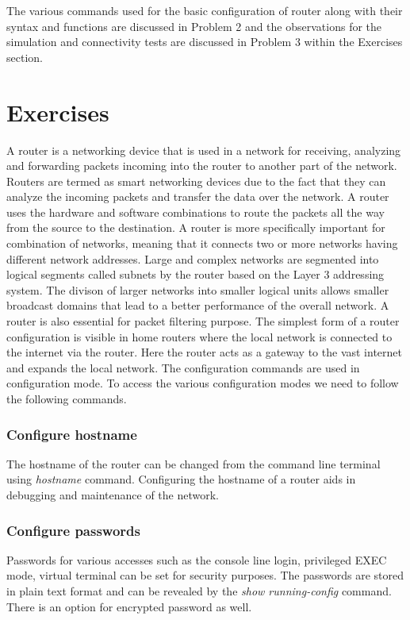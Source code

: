 \documentclass{lab_sheet}
\newcommand{\syntax}[2]{
    
}
\begin{document}
    The various commands used for the basic configuration of router along with their syntax and functions are discussed in Problem 2 and the observations for the simulation and connectivity tests are discussed in Problem 3 within the Exercises section.
    \section{Exercises}
    A router is a networking device that is used in a network for receiving, analyzing and forwarding packets incoming into the router to another part of the network. Routers are termed as smart networking devices due to the fact that they can analyze the incoming packets and transfer the data over the network. A router uses the hardware and software combinations to route the packets all the way from the source to the destination. A router is more specifically important for combination of networks, meaning that it connects two or more networks having different network addresses. Large and complex networks are segmented into logical segments called subnets by the router based on the Layer 3 addressing system. The divison of larger networks into smaller logical units allows smaller broadcast domains that lead to a better performance of the overall network. A router is also essential for packet filtering purpose. The simplest form of a router configuration is visible in home routers where the local network is connected to the internet via the router. Here the router acts as a gateway to the vast internet and expands the local network.
    The configuration commands are used in configuration mode. To access the various configuration modes we need to follow the following commands.
    \syntax{modes}{various router modes}
    \subsubsection*{Configure hostname}
    The hostname of the router can be changed from the command line terminal using \textit{hostname} command. Configuring the hostname of a router aids in debugging and maintenance of the network. 
    \syntax{hn}{configuring hostname}
    \subsubsection*{Configure passwords}
    Passwords for various accesses such as the console line login, privileged EXEC mode, virtual terminal can be set for security purposes. The passwords are stored in plain text format and can be revealed by the \textit{show running-config} command. There is an option for encrypted password as well.
    \syntax{pwd}{configuring router passwords}
\end{document}
